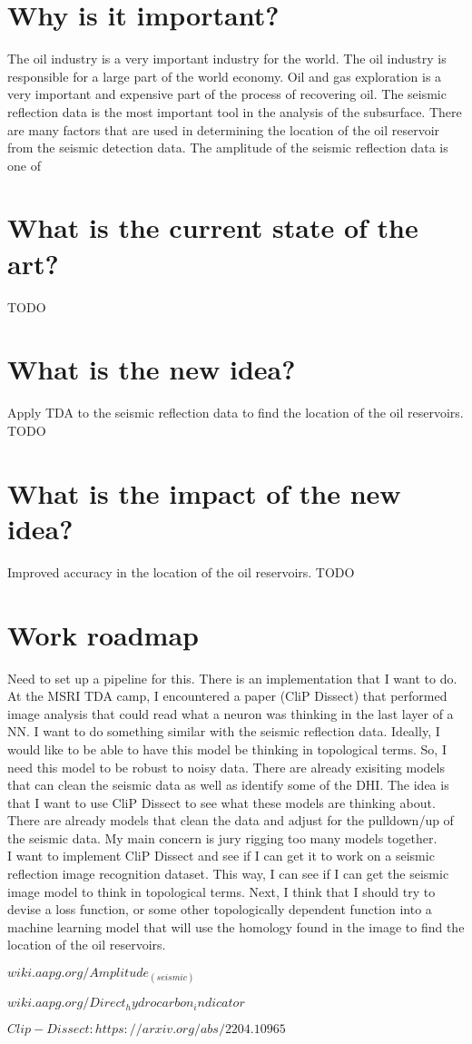 \documentclass{article}
\begin{document}
\section{Why is it important?}

The oil industry is a very important industry for the world. The oil industry is responsible for a
large part of the world economy. Oil and gas exploration is a very important and expensive part of
the process of recovering oil. The seismic reflection data is the most important tool in the
analysis of the subsurface. There are many factors that are used in determining the location of the
oil reservoir from the seismic detection data. The amplitude of the seismic reflection data is one
of


\section{What is the current state of the art?}

TODO

\section{What is the new idea?}

Apply TDA to the seismic reflection data to find the location of the oil reservoirs. TODO

\section{What is the impact of the new idea?}

Improved accuracy in the location of the oil reservoirs. TODO

\section{Work roadmap}

Need to set up a pipeline for this. There is an implementation that I want to do. At the MSRI TDA
camp, I encountered a paper (CliP Dissect) that performed image analysis that could read what a
neuron was thinking in the last layer of a NN. 
I want to do something similar with the seismic reflection data.
Ideally, I would like to be able to have this model be thinking in topological terms. 
So, I need this model to be robust to noisy data. There are already exisiting models that can clean
the seismic data as well as identify some of the DHI. The idea is that I want to use CliP Dissect to
see what these models are thinking about. 
There are already models that clean the data and adjust for the pulldown/up of the seismic data. My
main concern is jury rigging too many models together.
\\ I want to implement CliP Dissect and see if I can get it to work on a
seismic reflection image recognition dataset. This way, I can see if I can get the seismic image model
to think in topological terms. Next, I think that I should try to devise a loss function, or some
other topologically dependent function into a machine learning model that will use the homology
found in the image to find the location of the oil reservoirs.








$wiki.aapg.org/Amplitude_(seismic)$

$wiki.aapg.org/Direct_hydrocarbon_indicator$

$Clip-Dissect: https://arxiv.org/abs/2204.10965$
\end{document}

